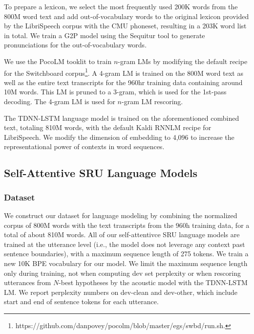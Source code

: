 \documentclass[a4paper]{article}
\begin{document}
To prepare a lexicon, we select the most frequently used 200K words from the 800M word text and add out-of-vocabulary words to the original lexicon provided by the LibriSpeech corpus with the CMU phoneset, resulting in a 203K word list in total. We train
a G2P model using the Sequitur tool \cite{sequitur} to generate pronunciations for the out-of-vocabulary words. 

We use the PocoLM tooklit to train $n$-gram LMs by modifying the default recipe for the Switchboard corpus\footnote{https://github.com/danpovey/pocolm/blob/master/egs/swbd/run.sh.}. A 4-gram LM is trained on the 800M word text as well as the entire text transcripts for the 960hr training data containing around 10M words. This LM is pruned to a 3-gram, which is used for the 1st-pass decoding. The 4-gram LM is used for $n$-gram LM rescoring.

The TDNN-LSTM language model is trained on the aforementioned combined text, totaling 810M words, with the default Kaldi RNNLM recipe for LibriSpeech. We modify the dimension of embedding to 4,096 to increase the representational power of contexts in word sequences.

\subsection{Self-Attentive SRU Language Models}

\subsubsection{Dataset}
We construct our dataset for language modeling by combining the normalized corpus of 800M words with the text transcripts from the 960h training data, for a total of about 810M words. All of our self-attentivce SRU language models are trained at the utterance level (i.e., the model does not leverage any context past sentence boundaries), with a maximum sequence length of 275 tokens. We train a new 10K BPE vocabulary for our model. We limit the maximum sequence length only during training, not when computing dev set perplexity or when rescoring utterances from $N$-best hypotheses by the acoustic model with the TDNN-LSTM LM. We report perplexity numbers on dev-clean and dev-other, which include start and end of sentence tokens for each utterance.
\end{document}
